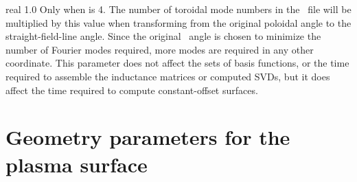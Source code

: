 \myhrule

{real}
{1.0}
{Only when  is 4.}
{The number of toroidal mode numbers in the \vmec~file will be multiplied by this value
when transforming from the original poloidal angle to the straight-field-line angle.
Since the original \vmec~angle is chosen to minimize the number of Fourier modes required,
more modes are required in any other coordinate.
This parameter does not affect the sets of basis functions,
or the time required to assemble the inductance matrices or
computed SVDs, but it does affect the time required to compute constant-offset surfaces.
}

\section{Geometry parameters for the plasma surface}

